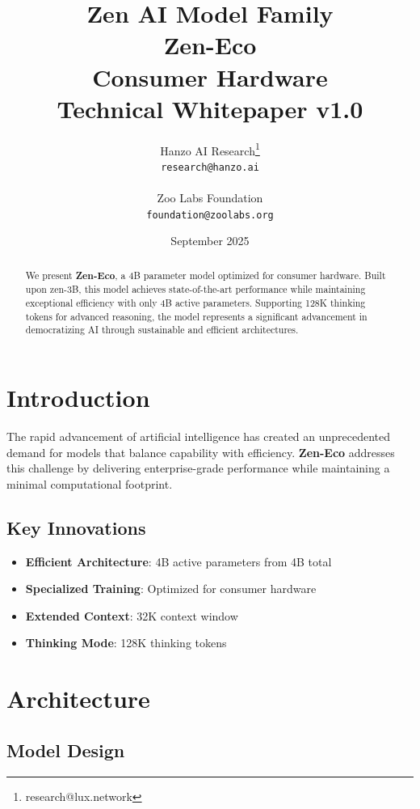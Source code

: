 \documentclass[11pt,a4paper]{article}
\title{
    \vspace{-2cm}
    \Large \textbf{Zen AI Model Family} \\
    \vspace{0.5cm}
    \Huge \textbf{Zen-Eco} \\
    \vspace{0.3cm}
    \large Consumer Hardware \\
    \vspace{0.5cm}
    \normalsize Technical Whitepaper v1.0
}
\author{
    Hanzo AI Research\thanks{research@lux.network} \\
    \texttt{research@hanzo.ai} \\
    \\
    Zoo Labs Foundation \\
    \texttt{foundation@zoolabs.org}
}
\date{September 2025}
\begin{document}
\maketitle

\begin{abstract}
We present \textbf{Zen-Eco}, a 4B parameter model optimized for consumer hardware. 
Built upon zen-3B, this model achieves state-of-the-art performance while maintaining exceptional efficiency 
with only 4B active parameters. Supporting 128K thinking tokens for advanced reasoning, the model represents a significant advancement in democratizing AI through sustainable and efficient architectures.
\end{abstract}

\tableofcontents
\newpage

\section{Introduction}

The rapid advancement of artificial intelligence has created an unprecedented demand for models that balance capability with efficiency. 
\textbf{Zen-Eco} addresses this challenge by delivering enterprise-grade performance while maintaining a minimal computational footprint.

\subsection{Key Innovations}
\begin{itemize}
    \item \textbf{Efficient Architecture}: 4B active parameters from 4B total
    \item \textbf{Specialized Training}: Optimized for consumer hardware
    \item \textbf{Extended Context}: 32K context window
    \item \textbf{Thinking Mode}: 128K thinking tokens
\end{itemize}
    
    

\section{Architecture}

\subsection{Model Design}
\end{document}
